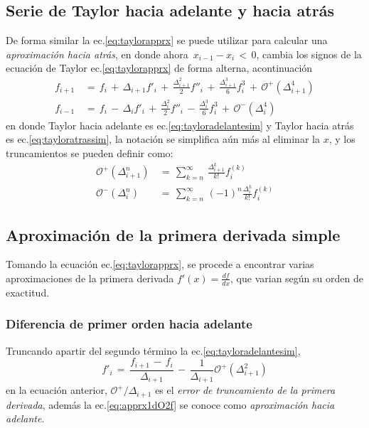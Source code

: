 \documentclass[9pt,technote,twoside,letterpaper,onecolumn]{IEEEtran}
\begin{document}
\begin{multicols}{2}
\subsection{Serie de Taylor hacia adelante y hacia atrás}
\label{sec:backford}
 De forma similar la ec.\ref{eq:taylorapprx} se puede utilizar para calcular una \emph{aproximación hacia atrás}, en donde ahora $\,x_{i-1}-x_i\,<\,0$, cambia los signos de la ecuación de Taylor ec.\ref{eq:taylorapprx} de forma alterna, acontinuación
\begin{align}
  f_{i+1}&\,=\,f_i\,+\,\Delta_{i+1}f'_i\,+\,\frac{\Delta^2_{i+1}}{2}f''_i\,+\,\frac{\Delta^3_{i+1}}{6}f^3_i\,+\,\mathcal{O}^+(\Delta^4_{i+1})  \label{eq:tayloradelantesim}
  \\
 f_{i-1}&\,=\,f_i\,-\,\Delta_{i}f'_i\,+\,\frac{\Delta^2_{i}}{2}f''_i\,-\,\frac{\Delta^3_{i}}{6}f^3_i\,+\,\mathcal{O}^-(\Delta^4_{i}) 
  \label{eq:tayloratrassim}
\end{align}
en donde Taylor hacia adelante es ec.\ref{eq:tayloradelantesim} y Taylor hacia atrás es ec.\ref{eq:tayloratrassim},  la notación se simplifica aún más al eliminar la $x$, y los truncamientos se pueden definir como:
\begin{align}
  \mathcal{O}^+(\Delta^n_{i+1})&\,=\,\sum^\infty_{k=n}\,\frac{\Delta^k_{i+1}}{k!}f^{(k)}_i\label{eq:Otayloradelante}\\
  \mathcal{O}^-(\Delta^n_{i})&\,=\,\sum^\infty_{k=n}\,(-1)^n\frac{\Delta^k_i}{k!}f^{(k)}_i\label{eq:Otayloratras}
\end{align}

\subsection{Aproximación de la primera derivada simple}
\label{sec:primder}

Tomando la ecuación ec.\ref{eq:taylorapprx}, se procede a encontrar varias aproximaciones de la primera derivada $f'(x)=\frac{df}{dx}$, que varian según su orden de exactitud.

\subsubsection{Diferencia de primer orden hacia adelante}
\label{sec:dif1Da}
Truncando apartir del segundo término la ec.\ref{eq:tayloradelantesim},
\begin{equation}
  f'_i\,=\,\frac{f_{i+1}\,-\,f_i}{\Delta_{i+1}}\,-\,\frac{1}{\Delta_{i+1}}\mathcal{O}^+(\Delta^2_{i+1})
  \label{eq:apprx1dO2f}
\end{equation}
en la ecuación anterior, $\mathcal{O}^+/\Delta_{i+1}$ es el \emph{error de truncamiento de la primera derivada}, además la ec.\ref{eq:apprx1dO2f} se conoce como \emph{aproximación hacia adelante}.


\end{multicols}
\end{document}
